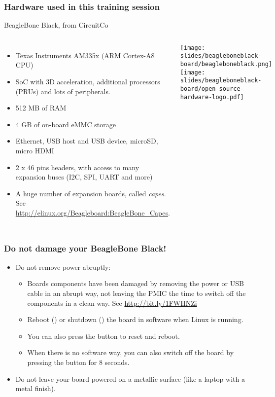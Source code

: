 \begin{frame}
\frametitle{Hardware used in this training session}
  BeagleBone Black, from CircuitCo
  \begin{columns}
    \footnotesize
    \begin{itemize}
      \item Texas Instruments AM335x (ARM Cortex-A8 CPU)
      \item SoC with 3D acceleration, additional processors
        (PRUs) and lots of peripherals.
      \item 512 MB of RAM
      \item 4 GB of on-board eMMC storage
      \item Ethernet, USB host and USB device, microSD, micro HDMI
      \item 2 x 46 pins headers, with access to many expansion buses
        (I2C, SPI, UART and more)
      \item A huge number of expansion boards, called {\em capes}.
        See \url{http://elinux.org/Beagleboard:BeagleBone_Capes}.
    \end{itemize}
    \begin{center}
      \texttt{[image: slides/beagleboneblack-board/beagleboneblack.png]}\\
      \texttt{[image: slides/beagleboneblack-board/open-source-hardware-logo.pdf]}
    \end{center}
  \end{columns}
\end{frame}

\begin{frame}
\frametitle{Do not damage your BeagleBone Black!}
\begin{itemize}
  \item Do not remove power abruptly:
  \begin{itemize}
     \item Boards components have been damaged by removing the power or
           USB cable in an abrupt way, not leaving the PMIC the time to
           switch off the components in a clean way. See
           \url{http://bit.ly/1FWHNZi}
     \item Reboot () or shutdown () the board
	   in software when Linux is running.
     \item You can also press the  button to reset and
	   reboot.
     \item When there is no software way, you can also switch off
	   the board by pressing the  button for 8 seconds.
  \end{itemize}
  \item Do not leave your board powered on a metallic surface (like a
        laptop with a metal finish).
\end{itemize}
\end{frame}
